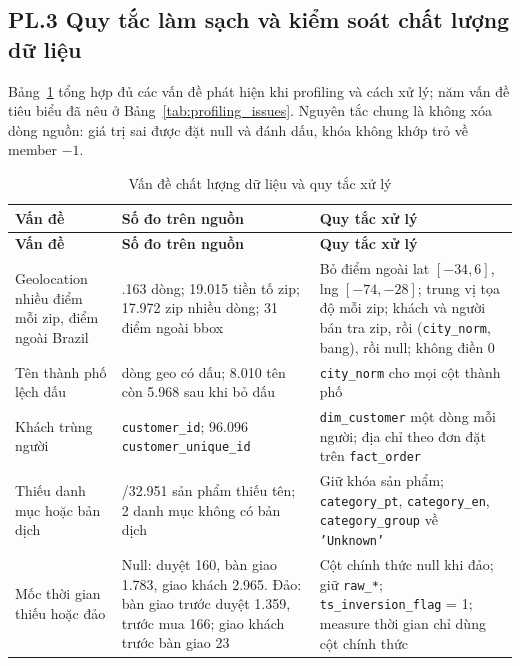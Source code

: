 \documentclass[a4paper]{article}
\begin{document}
\label{pl:3}
\subsection*{PL.3 Quy tắc làm sạch và kiểm soát chất lượng dữ liệu}

Bảng~\ref{tab:pl_clean} tổng hợp đủ các vấn đề phát hiện khi profiling và cách xử lý; năm vấn đề tiêu biểu đã nêu ở Bảng~\ref{tab:profiling_issues}. Nguyên tắc chung là không xóa dòng nguồn: giá trị sai được đặt null và đánh dấu, khóa không khớp trỏ về member $-1$.

{\footnotesize
\setlength{\tabcolsep}{3pt}
\renewcommand{\arraystretch}{1.12}
\begin{longtable}{@{}>{\raggedright\arraybackslash}p{3.4cm}>{\raggedright\arraybackslash}p{4.6cm}>{\raggedright\arraybackslash}p{8.2cm}@{}}
\caption{Vấn đề chất lượng dữ liệu và quy tắc xử lý}\label{tab:pl_clean}\\
\toprule
\textbf{Vấn đề} & \textbf{Số đo trên nguồn} & \textbf{Quy tắc xử lý} \\
\midrule
\endfirsthead
\toprule
\textbf{Vấn đề} & \textbf{Số đo trên nguồn} & \textbf{Quy tắc xử lý} \\
\midrule
\endhead
\bottomrule
\endfoot
Geolocation nhiều điểm mỗi zip, điểm ngoài Brazil & 1.000.163 dòng; 19.015 tiền tố zip; 17.972 zip nhiều dòng; 31 điểm ngoài bbox & Bỏ điểm ngoài lat $[-34, 6]$, lng $[-74, -28]$; trung vị tọa độ mỗi zip; khách và người bán tra zip, rồi (\texttt{city\_\allowbreak{}norm}, bang), rồi null; không điền 0 \\
\addlinespace
Tên thành phố lệch dấu & 73.437 dòng geo có dấu; 8.010 tên còn 5.968 sau khi bỏ dấu & \texttt{city\_\allowbreak{}norm} cho mọi cột thành phố \\
\addlinespace
Khách trùng người & 99.441 \texttt{customer\_\allowbreak{}id}; 96.096 \texttt{customer\_\allowbreak{}unique\_\allowbreak{}id} & \texttt{dim\_\allowbreak{}customer} một dòng mỗi người; địa chỉ theo đơn đặt trên \texttt{fact\_\allowbreak{}order} \\
\addlinespace
Thiếu danh mục hoặc bản dịch & 610/32.951 sản phẩm thiếu tên; 2 danh mục không có bản dịch & Giữ khóa sản phẩm; \texttt{category\_\allowbreak{}pt}, \texttt{category\_\allowbreak{}en}, \texttt{category\_\allowbreak{}group} về \texttt{'Unknown'} \\
\addlinespace
Mốc thời gian thiếu hoặc đảo & Null: duyệt 160, bàn giao 1.783, giao khách 2.965. Đảo: bàn giao trước duyệt 1.359, trước mua 166; giao khách trước bàn giao 23 & Cột chính thức null khi đảo; giữ \texttt{raw\_\allowbreak{}*}; \texttt{ts\_\allowbreak{}inversion\_\allowbreak{}flag} = 1; measure thời gian chỉ dùng cột chính thức \\

\end{longtable}}
\end{document}
